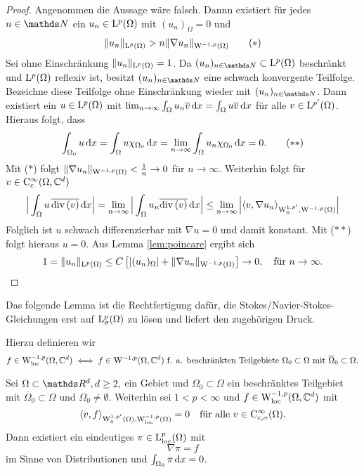 \begin{proof}
  Angenommen die Aussage wäre falsch.
  Dannn existiert für jedes $n \in \N$ ein $u_n \in \mathrm{L}^p(\Omega)$ mit $(u_n)_\Omega = 0$ und
  \begin{align*}
    \|u_n\|_{\mathrm{L}^p(\Omega)} > n \|\nabla u_n \|_{\mathrm{W}^{-1,p}(\Omega)} \tag{$\ast$}
  \end{align*}
  Sei ohne Einschränkung $\|u_n\|_{\mathrm{L}^p(\Omega)} = 1$.
  Da $(u_n)_{n \in \N} \subset \Ell^p(\Omega)$ beschränkt und $\mathrm{L}^p(\Omega)$ reflexiv ist, besitzt $(u_n)_{n \in \N}$ eine schwach konvergente Teilfolge.
  Bezeichne diese Teilfolge ohne Einschränkung wieder mit $(u_n)_{n \in \N}$.
  Dann existiert ein $u \in \mathrm{L}^p(\Omega)$ mit $\lim_{n \to \infty} \int_\Omega u_n \overline v \, {\operatorname{d}\!{x}} = \int_\Omega u \overline v \, {\operatorname{d}\!{x}}$ für alle $v \in \mathrm{L}^{p'}(\Omega)$.
  Hieraus folgt, dass
  \begin{align*}
  \int_{\Omega_0} u \, {\operatorname{d}\!{x}} 
  = \int_\Omega u \chi_{\Omega_0} \, {\operatorname{d}\!{x}}
  = \lim_{n \to \infty} \int_\Omega u_n \chi_{\Omega_0} \, {\operatorname{d}\!{x}} = 0. \tag{$\ast\ast$}
  \end{align*}
  Mit ($\ast$) folgt $\|\nabla u_n\|_{\mathrm{W}^{-1,p}(\Omega)} < \frac{1}{n} \to 0$ für $n \to \infty$.
  Weiterhin folgt für $v \in \mathrm{C}_{\mathrm{c}}^\infty(\Omega,\mathbb{C}^d)$
  $$
  \Big| \int_\Omega u \, \overline{\mathrm{div\,} (v)} \, {\operatorname{d}\!{x}} \Big|
  = \lim_{n \to \infty} \Big| \int_\Omega u_n \overline{\mathrm{div\,} (v)} \, {\operatorname{d}\!{x}} \Big|
  \leq \lim_{n \to \infty} \Big| \langle v, \nabla u_n \rangle_{\mathrm{W}_0^{1,p'}, \mathrm{W}^{-1,p}(\Omega)} \Big|
  $$
  Folglich ist $u$ schwach differenzierbar mit $\nabla u = 0$ und damit konstant.
  Mit ($\ast\ast$) folgt hieraus $u = 0$.
  Aus Lemma \ref{lem:poincare} ergibt sich
  \[
  1 = \|u_n\|_{\mathrm{L}^p(\Omega)}
  \leq C \left[ |(u_n)_\Omega| + \|\nabla u_n\|_{\mathrm{W}^{-1,p}(\Omega)} \right] \to 0, \quad\text{für } n \to \infty. \qedhere
  \]
\end{proof}

Das folgende Lemma ist die Rechtfertigung dafür, die Stokes/Navier-Stokes-Gleichungen erst auf $\mathrm{L}_\sigma^p(\Omega)$ zu lösen und liefert den zugehörigen Druck.

Hierzu definieren wir
$$
f \in \mathrm{W}_{\operatorname{loc}}^{-1,p}(\Omega, \mathbb{C}^d) \iff f \in \mathrm{W}^{-1,p}(\Omega, \mathbb{C}^d) \text{ f. a. beschränkten Teilgebiete } \Omega_0 \subset \Omega \text{ mit } \overline\Omega_0 \subset \Omega.
$$

\begin{lem}
  \label{lem:pressureGrad}
  Sei $\Omega \subset \R^d, d \geq 2,$ ein Gebiet und $\Omega_0 \subset \Omega$ ein beschränktes Teilgebiet mit $\overline\Omega_0 \subset \Omega$ und $\Omega_0 \neq \emptyset$.
  Weiterhin sei $1 < p < \infty$ und $f \in \mathrm{W}_{\operatorname{loc}}^{-1,p}(\Omega, \mathbb{C}^d)$ mit
  $$
  \langle v , f \rangle_{\mathrm{W}_0^{1,p'}(\Omega), \mathrm{W}_{\operatorname{loc}}^{-1,p}(\Omega)} = 0 \quad\text{für alle } v \in \mathrm{C}_{\mathrm{c},\sigma}^\infty(\Omega).
  $$
  Dann existiert ein eindeutiges $\pi \in \mathrm{L}^p_{\operatorname{loc}}(\Omega)$ mit
  $$
  \nabla \pi = f
  $$
  im Sinne von Distributionen und $\int_{\Omega_0} \pi \, {\operatorname{d}\!{x}} = 0$.
\end{lem}

